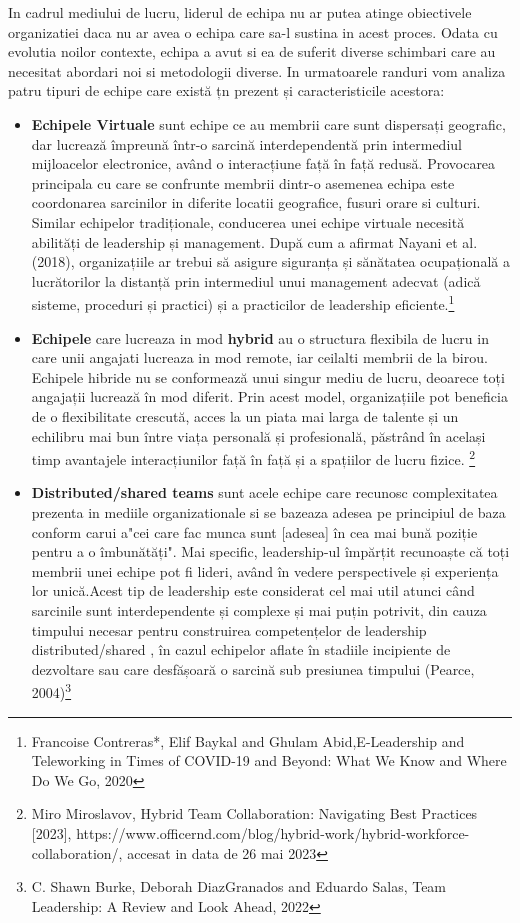 \documentclass[a4paper, 12pt]{article}
\begin{document}
	\quad\quad In cadrul mediului de lucru, liderul de echipa nu ar putea atinge obiectivele organizatiei daca nu ar avea o echipa care sa-l sustina in acest proces. Odata cu evolutia noilor contexte, echipa a avut si ea de suferit diverse schimbari care au necesitat abordari noi si metodologii diverse. In urmatoarele randuri vom analiza patru tipuri de echipe care există țn prezent și caracteristicile acestora:


	\begin{itemize}

	\item \textbf{Echipele Virtuale} sunt echipe ce au membrii care sunt dispersați geografic, dar lucrează împreună într-o sarcină interdependentă prin intermediul mijloacelor electronice, având o interacțiune față în față redusă. Provocarea principala cu care se confrunte membrii dintr-o asemenea echipa este coordonarea sarcinilor in diferite locatii geografice, fusuri orare si culturi. Similar echipelor tradiționale, conducerea unei echipe virtuale necesită abilități de leadership și management. După cum a afirmat Nayani et al. (2018), organizațiile ar trebui să asigure siguranța și sănătatea ocupațională a lucrătorilor la distanță prin intermediul unui management adecvat (adică sisteme, proceduri și practici) și a practicilor de leadership eficiente.\footnote{Francoise Contreras*, Elif Baykal and Ghulam Abid,E-Leadership and Teleworking in Times of COVID-19 and Beyond: What We Know and Where Do We Go, 2020}

	\item \textbf{Echipele} care lucreaza in mod \textbf{hybrid} au o structura flexibila de lucru in care unii angajati lucreaza in mod remote, iar ceilalti membrii de la birou. Echipele hibride nu se conformează unui singur mediu de lucru, deoarece toți angajații lucrează în mod diferit. Prin acest model, organizațiile pot beneficia de o flexibilitate crescută, acces la un piata mai larga de talente și un echilibru mai bun între viața personală și profesională, păstrând în același timp avantajele interacțiunilor față în față și a spațiilor de lucru fizice. \footnote{Miro Miroslavov, Hybrid Team Collaboration: Navigating Best Practices [2023], https://www.officernd.com/blog/hybrid-work/hybrid-workforce-collaboration/,  accesat in data de 26 mai 2023}

	\item \textbf {Distributed/shared teams} sunt acele echipe care recunosc complexitatea prezenta in mediile organizationale si se bazeaza adesea pe principiul de baza conform carui a"cei care fac munca sunt [adesea] în cea mai bună poziție pentru a o îmbunătăți". Mai specific, leadership-ul împărțit recunoaște că toți membrii unei echipe pot fi lideri, având în vedere perspectivele și experiența lor unică.Acest tip de leadership este considerat cel mai util atunci când sarcinile sunt interdependente și complexe și mai puțin potrivit, din cauza timpului necesar pentru construirea competențelor de leadership distributed/shared , în cazul echipelor aflate în stadiile incipiente de dezvoltare sau care desfășoară o sarcină sub presiunea timpului (Pearce, 2004)\footnote{C. Shawn Burke, Deborah DiazGranados and Eduardo Salas, Team Leadership: A Review and Look Ahead, 2022}



\end{itemize}
\end{document}

